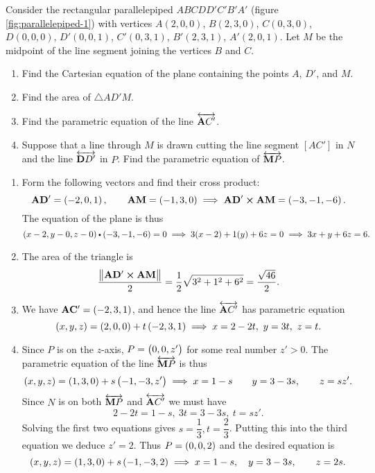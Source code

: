 \begin{exa}
\label{pro:parallelepiped-1} Consider the rectangular parallelepiped
$ABCDD'C'B'A'$ (figure \ref{fig:parallelepiped-1}) with vertices
$A(2,0,0)$, $B(2,3,0)$, $C(0,3,0)$, $D(0,0,0)$, $D'(0,0,1)$,
$C'(0,3,1)$, $B'(2,3,1)$, $A'(2,0,1)$. Let $M$ be the midpoint of
the line segment joining the vertices $B$ and $C$.
\begin{enumerate}
\item Find the Cartesian equation of the plane containing the points $A$, $D'$,
and $M$.
\item Find the area of $\triangle AD'M$.
\item Find the parametric equation of the line $\overleftrightarrow{{\mathbf AC'}}$.
\item Suppose that a line through $M$ is drawn cutting  the line segment $[AC']$
in $N$ and the line  $\overleftrightarrow{{\mathbf DD'}}$ in $P$. Find the parametric
equation of $\overleftrightarrow{{\mathbf MP}}$.
\end{enumerate}
\end{exa}
\begin{solu}
\noindent
\begin{enumerate}
\item Form the following vectors and find their cross product:
$$\mathbf{ AD'}= \left( -2, 0 , 1 \right), \qquad  \mathbf{ AM}= \left( -1, 3 , 0  \right) \implies \mathbf{ AD'}\boldsymbol\times\mathbf{ AM} = \left( -3, -1, -6 \right).  $$The
equation of the plane is thus
$$ \coord{x-2, y - 0 , z-0}\bp \coord{-3 , -1, -6} =0\implies  3(x-2)+1(y) +6z =0 \implies 3x+y+6z=6.$$
\item The area of the triangle is
$$ \dfrac{{\left\|\mathbf{ AD'}\boldsymbol\times\mathbf{ AM}\right\|}}{2} = \dfrac{1}{2}\sqrt{3^2+1^2+6^2} = \dfrac{\sqrt{46}}{2}.  $$
\item We have $\mathbf{ AC'}=\left( -2, 3, 1 \right)$, and hence the line $\overleftrightarrow{{\mathbf AC'}}$ has parametric equation
$$ \left( x, y , z \right) = \left( 2, 0 , 0 \right) + t\left( -2, 3 , 1 \right) \implies x=2-2t, \ y = 3t, \ z=t.$$
\item  Since $P$ is on the $z$-axis, $P=\left( 0, 0  , z' \right)$ for some real number $z'>0$. The parametric equation of the line $\overleftrightarrow{{\mathbf MP}}$ is thus
$$\left( x, y , z \right) = \left( 1, 3, 0 \right) + s\left( -1, -3, z' \right)\implies x= 1-s\qquad y =3-3s, \qquad z =sz'.  $$
Since $N$ is on both $\overleftrightarrow{{\mathbf MP}}$ and $\overleftrightarrow{{\mathbf AC'}}$ we must have
$$ 2-2t = 1-s,\  3t= 3-3s, \ t = sz'. $$ Solving the first two  equations gives $s=\dfrac{1}{3}, t=\dfrac{2}{3}$. Putting this into the third  equation we deduce $z'=2$. Thus $P=\left( 0, 0 , 2 \right)$ and the desired equation is
$$\left( x, y , z \right) = \left( 1, 3, 0 \right) + s\left( -1 , -3 , 2 \right) \implies x=1-s, \quad y = 3-3s, \qquad z=2s.  $$
\end{enumerate}
\end{solu}





